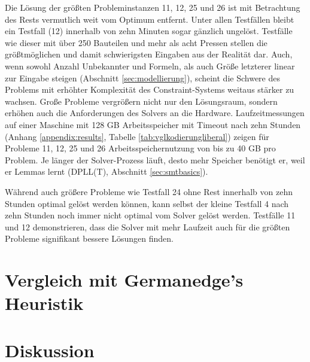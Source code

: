 Die Lösung der größten Probleminstanzen 11, 12, 25 und 26 ist mit Betrachtung des Rests vermutlich weit vom Optimum entfernt.
Unter allen Testfällen bleibt ein Testfall (12) innerhalb von zehn Minuten sogar gänzlich ungelöst.
Testfälle wie dieser mit über 250 Bauteilen und mehr als acht Pressen stellen die größtmöglichen und damit schwierigsten Eingaben aus der Realität dar.
Auch, wenn sowohl Anzahl Unbekannter und Formeln, als auch Größe letzterer linear zur Eingabe steigen (Abschnitt \ref{sec:modellierung}),
scheint die Schwere des Problems mit erhöhter Komplexität des Constraint-Systems weitaus stärker zu wachsen.
Große Probleme vergrößern nicht nur den Lösungsraum, sondern erhöhen auch die Anforderungen des Solvers an die Hardware.
Laufzeitmessungen auf einer Maschine mit 128 GB Arbeitsspeicher mit Timeout nach zehn Stunden (Anhang \ref{appendix:results}, Tabelle \ref{tab:vglkodierungliberal}) zeigen für Probleme
11, 12, 25 und 26 Arbeitsspeichernutzung von bis zu 40 GB pro Problem.
Je länger der Solver-Prozess läuft, desto mehr Speicher benötigt er, weil er Lemmas lernt (DPLL(T), Abschnitt \ref{sec:smtbasics}).

Während auch größere Probleme wie Testfall 24 ohne Rest innerhalb von zehn Stunden optimal gelöst werden können, kann selbst der kleine Testfall 4 nach zehn Stunden
noch immer nicht optimal vom Solver gelöst werden.
Testfälle 11 und 12 demonstrieren, dass die Solver mit mehr Laufzeit auch für die größten Probleme signifikant bessere Lösungen finden.

\section{Vergleich mit Germanedge's Heuristik}

\section{Diskussion}
